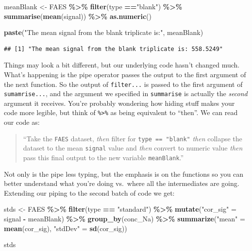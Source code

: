\documentclass[
]{book}
\newenvironment{Shaded}{\begin{snugshade}}{\end{snugshade}}
\newcommand{\FunctionTok}[1]{\textcolor[rgb]{0.13,0.29,0.53}{\textbf{#1}}}
\newcommand{\NormalTok}[1]{#1}
\newcommand{\OtherTok}[1]{\textcolor[rgb]{0.56,0.35,0.01}{#1}}
\newcommand{\SpecialCharTok}[1]{\textcolor[rgb]{0.81,0.36,0.00}{\textbf{#1}}}
\newcommand{\StringTok}[1]{\textcolor[rgb]{0.31,0.60,0.02}{#1}}
\begin{document}
\begin{Shaded}
\begin{Highlighting}[]
\NormalTok{meanBlank }\OtherTok{\textless{}{-}}\NormalTok{ FAES }\SpecialCharTok{\%\textgreater{}\%}
  \FunctionTok{filter}\NormalTok{(type }\SpecialCharTok{==}\StringTok{"blank"}\NormalTok{) }\SpecialCharTok{\%\textgreater{}\%}
  \FunctionTok{summarise}\NormalTok{(}\FunctionTok{mean}\NormalTok{(signal)) }\SpecialCharTok{\%\textgreater{}\%}
  \FunctionTok{as.numeric}\NormalTok{()}

\FunctionTok{paste}\NormalTok{(}\StringTok{"The mean signal from the blank triplicate is:"}\NormalTok{, meanBlank)}
\end{Highlighting}
\end{Shaded}

\begin{verbatim}
## [1] "The mean signal from the blank triplicate is: 558.5249"
\end{verbatim}

Things may look a bit different, but our underlying code hasn't changed much. What's happening is the pipe operator passes the output to the first argument of the next function. So the output of \texttt{filter...} is passed to the first argument of \texttt{sumamrise...}, and the argument we specified in \texttt{summarise} is actually the \emph{second} argument it receives. You're probably wondering how hiding stuff makes your code more legible, but think of \texttt{\%\textgreater{}\%} as being equivalent to ``then''. We can read our code as:

\begin{quote}
``Take the \texttt{FAES} dataset, \emph{then} filter for \texttt{type\ ==\ "blank"} \emph{then} collapse the dataset to the mean \texttt{signal} value and \emph{then} convert to numeric value \emph{then} pass this final output to the new variable \texttt{meanBlank}.''
\end{quote}

Not only is the pipe less typing, but the emphasis is on the functions so you can better understand what you're doing vs.~where all the intermediates are going. Extending our piping to the second batch of code we get:

\begin{Shaded}
\begin{Highlighting}[]
\NormalTok{stds }\OtherTok{\textless{}{-}}\NormalTok{ FAES }\SpecialCharTok{\%\textgreater{}\%}
  \FunctionTok{filter}\NormalTok{(type }\SpecialCharTok{==} \StringTok{"standard"}\NormalTok{) }\SpecialCharTok{\%\textgreater{}\%}
  \FunctionTok{mutate}\NormalTok{(}\StringTok{"cor\_sig"} \OtherTok{=}\NormalTok{ signal }\SpecialCharTok{{-}}\NormalTok{ meanBlank) }\SpecialCharTok{\%\textgreater{}\%} 
  \FunctionTok{group\_by}\NormalTok{(conc\_Na) }\SpecialCharTok{\%\textgreater{}\%}
  \FunctionTok{summarize}\NormalTok{(}\StringTok{"mean"} \OtherTok{=} \FunctionTok{mean}\NormalTok{(cor\_sig), }\StringTok{"stdDev"} \OtherTok{=} \FunctionTok{sd}\NormalTok{(cor\_sig))}

\NormalTok{stds}
\end{Highlighting}
\end{Shaded}
\end{document}
